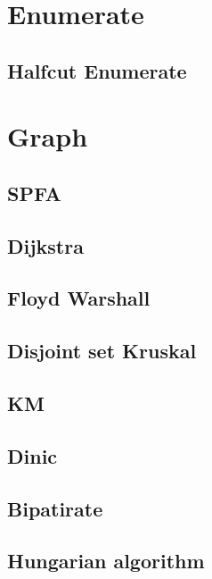 \section{Enumerate} 
        \subsection{Halfcut Enumerate}
                

\section{Graph}
        \subsection{SPFA}
                
        \subsection{Dijkstra}
                
        \subsection{Floyd Warshall}
                
        \subsection{Disjoint set Kruskal}
                
        \subsection{KM}
                
        \subsection{Dinic}
                
        \subsection{Bipatirate}
                
        \subsection{Hungarian algorithm}
                

